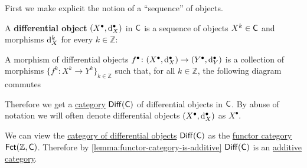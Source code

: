 \documentclass[../../main]{subfiles}
\begin{document}
First we make explicit the notion of a ``sequence'' of objects.
\begin{definition}\label{def:differential-object-additive}
  A \textbf{differential object} \((X^{\bullet}, \mathrm{d}_{X}^{\bullet})\) in \(\mathsf{C}\) is a sequence of objects \(X^{k} \in \mathsf{C}\) and morphisms \(\mathrm{d}_{X}^{k}\) for every \(k \in \mathbb{Z}\):
  \begin{center}
  \end{center}

  A morphism of differential objects \(f^{\bullet}\colon (X^{\bullet}, \mathrm{d}_{X}^{\bullet}) \to (Y^{\bullet}, \mathrm{d}_{Y}^{\bullet})\) is a collection of morphisms \(\{f^{k}\colon X^{k} \to Y^{k}\}_{k \in \mathbb{Z}}\) such that, for all \(k \in \mathbb{Z}\), the following diagram commutes
  \begin{center}
  \end{center}

  Therefore we get a \hyperref[def:category]{category} \(\mathsf{Diff}(\mathsf{C})\) of differential objects in \(\mathsf{C}\).
  By abuse of notation we will often denote differential objects \((X^{\bullet}, \mathrm{d}_{X}^{\bullet})\) as \(X^{\bullet}\).
\end{definition}

\begin{remark}
  We can view the \hyperref[def:differential-object-additive]{category of differential objects} \(\mathsf{Diff}(\mathsf{C})\) as the \hyperref[def:functor-category]{functor category} \(\mathsf{Fct}(\mathbb{Z}, \mathsf{C})\).
  Therefore by \autoref{lemma:functor-category-is-additive} \(\mathsf{Diff}(\mathsf{C})\) is an \hyperref[def:additive-category]{additive category}.
\end{remark}
\end{document}

